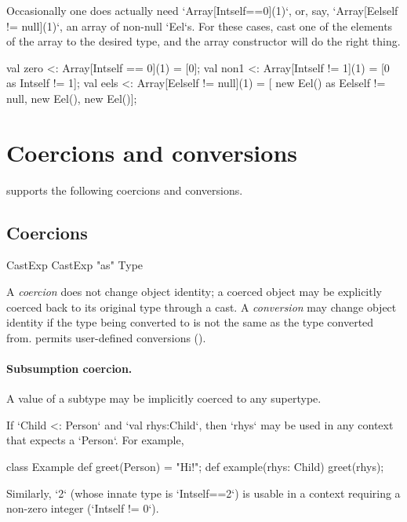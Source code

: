 \begin{ex}
Occasionally one does actually need \xcd`Array[Int{self==0}](1)`, 
or, say, \xcd`Array[Eel{self != null}](1)`, an array of non-null \xcd`Eel`s.  
For these cases, cast one of the elements of the array to the desired type,
and the array constructor will do the right thing.  
\begin{xten}
val zero <: Array[Int{self == 0}](1) 
          = [0];
val non1 <: Array[Int{self != 1}](1) 
          = [0 as Int{self != 1}];
val eels <: Array[Eel{self != null}](1) 
          = [ new Eel() as Eel{self != null}, new Eel(), new Eel()];
\end{xten}
\end{ex}


\section{Coercions and conversions}
\label{XtenConversions}
\label{User-definedCoercions}

\XtenCurrVer{} supports the following coercions and conversions.

\subsection{Coercions}

\begin{bbgrammar}
             CastExp \: CastExp \xcd"as" Type \\
\end{bbgrammar}


A {\em coercion} does not change object identity; a coerced object may
be explicitly coerced back to its original type through a cast. A {\em
  conversion} may change object identity if the type being converted
to is not the same as the type converted from. \Xten{} permits
user-defined conversions ().

\paragraph{Subsumption coercion.}
A value of a subtype may be implicitly coerced to any supertype.  

\begin{ex}
If \xcd`Child <: Person` and \xcd`val rhys:Child`, then \xcd`rhys` may be used
in any context that expects a \xcd`Person`.  For example, 
\begin{xten}
class Example {
  def greet(Person) = "Hi!";
  def example(rhys: Child) {
     greet(rhys);
  }
}
\end{xten}
%

Similarly, \xcd`2` (whose innate type is \xcd`Int{self==2}`)
is usable in a context requiring a non-zero integer
(\xcd`Int{self != 0}`).  
\end{ex}

